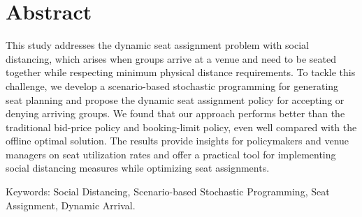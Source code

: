 
\section*{Abstract}

This study addresses the dynamic seat assignment problem with social distancing, which arises when groups arrive at a venue and need to be seated together while respecting minimum physical distance requirements. To tackle this challenge, we develop a scenario-based stochastic programming for generating seat planning and propose the dynamic seat assignment policy for accepting or denying arriving groups. We found that our approach performs better than the traditional bid-price policy and booking-limit policy, even well compared with the offline optimal solution. The results provide insights for policymakers and venue managers on seat utilization rates and offer a practical tool for implementing social distancing measures while optimizing seat assignments.


Keywords: Social Distancing, Scenario-based Stochastic Programming, Seat Assignment, Dynamic Arrival.



